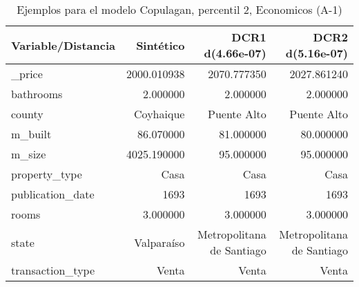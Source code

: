 \begin{table}[H]
\centering
\fontsize{10}{14}\selectfont
\caption{Ejemplos para el modelo Copulagan, percentil 2, Economicos (A-1)}
\label{table-example-economicos-a-1-copulagan-2p}
\begin{tabular}{|l|r|r|r|}
\hline
\rowcolor[gray]{0.8}
Variable/Distancia & Sintético & DCR1 d(4.66e-07) & DCR2 d(5.16e-07) \\
\hline \_price & \cellcolor[rgb]{0.9, 0.54, 0.52} 2000.010938 & 2070.777350 & 2027.861240 \\
\hline bathrooms & \cellcolor[rgb]{0.9, 0.54, 0.52} 2.000000 & \cellcolor[rgb]{0.9, 0.54, 0.52} 2.000000 & \cellcolor[rgb]{0.9, 0.54, 0.52} 2.000000 \\
\hline county & \cellcolor[rgb]{0.9, 0.54, 0.52} Coyhaique & Puente Alto & Puente Alto \\
\hline m\_built & \cellcolor[rgb]{0.9, 0.54, 0.52} 86.070000 & 81.000000 & 80.000000 \\
\hline m\_size & \cellcolor[rgb]{0.9, 0.54, 0.52} 4025.190000 & 95.000000 & 95.000000 \\
\hline property\_type & \cellcolor[rgb]{0.9, 0.54, 0.52} Casa & \cellcolor[rgb]{0.9, 0.54, 0.52} Casa & \cellcolor[rgb]{0.9, 0.54, 0.52} Casa \\
\hline publication\_date & \cellcolor[rgb]{0.9, 0.54, 0.52} 1693 & \cellcolor[rgb]{0.9, 0.54, 0.52} 1693 & \cellcolor[rgb]{0.9, 0.54, 0.52} 1693 \\
\hline rooms & \cellcolor[rgb]{0.9, 0.54, 0.52} 3.000000 & \cellcolor[rgb]{0.9, 0.54, 0.52} 3.000000 & \cellcolor[rgb]{0.9, 0.54, 0.52} 3.000000 \\
\hline state & \cellcolor[rgb]{0.9, 0.54, 0.52} Valparaíso & Metropolitana de Santiago & Metropolitana de Santiago \\
\hline transaction\_type & \cellcolor[rgb]{0.9, 0.54, 0.52} Venta & \cellcolor[rgb]{0.9, 0.54, 0.52} Venta & \cellcolor[rgb]{0.9, 0.54, 0.52} Venta \\
\hline
\end{tabular}
\end{table}
